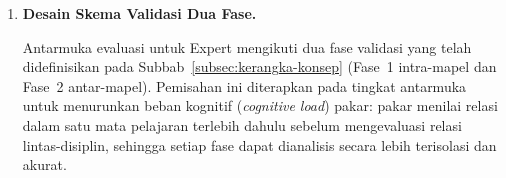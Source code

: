 \documentclass[main]{subfiles}
\begin{document}
\begin{enumerate}
  \item \textbf{Desain Skema Validasi Dua Fase.}

  Antarmuka evaluasi untuk Expert mengikuti dua fase validasi yang telah
  didefinisikan pada Subbab~\ref{subsec:kerangka-konsep} (Fase~1 intra-mapel dan
  Fase~2 antar-mapel). Pemisahan ini diterapkan pada tingkat antarmuka untuk
  menurunkan beban kognitif (\textit{cognitive load}) pakar: pakar menilai
  relasi dalam satu mata pelajaran terlebih dahulu sebelum mengevaluasi relasi
  lintas-disiplin, sehingga setiap fase dapat dianalisis secara lebih terisolasi
  dan akurat.
\end{enumerate}

\ifSubfilesClassLoaded{\printbibliography[title={Daftar Pustaka}]}{}
\end{document}
